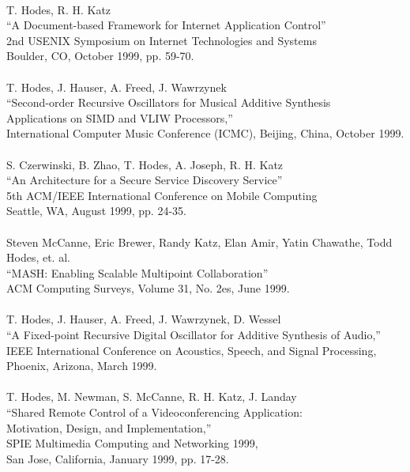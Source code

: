 \begin{tabbing}
\smallskip \\[-3pt]
\>    T. Hodes, R. H. Katz \\
\>\>      ``A Document-based Framework for Internet Application Control'' \\
\>\>       2nd USENIX Symposium on Internet Technologies and Systems \\
\>\>       Boulder, CO, October 1999, pp. 59-70. \\
\smallskip \\[-3pt]
\>    T. Hodes, J. Hauser, A. Freed, J. Wawrzynek\\
\>\>      ``Second-order Recursive Oscillators for Musical Additive Synthesis \\
\>\>\>        Applications on SIMD and VLIW Processors,'' \\
\>\>       International Computer Music Conference (ICMC), Beijing, China, October 1999. \\


\smallskip \\[-3pt]
\>    S. Czerwinski, B. Zhao, T. Hodes, A. Joseph, R. H. Katz \\
\>\>      ``An Architecture for a Secure Service Discovery Service'' \\
\>\>       5th ACM/IEEE International Conference on Mobile Computing \\
\>\>       Seattle, WA, August 1999, pp. 24-35. \\
\smallskip \\[-3pt]
\>    Steven McCanne, Eric Brewer, Randy Katz, Elan Amir, Yatin Chawathe,
    Todd Hodes, et. al. \\
\>\>      ``MASH: Enabling Scalable Multipoint Collaboration'' \\
\>\>       ACM Computing Surveys, Volume 31, No. 2es, June 1999. \\
\smallskip \\[-3pt]
\>    T. Hodes, J. Hauser, A. Freed, J. Wawrzynek, D. Wessel \\
\>\>      ``A Fixed-point Recursive Digital Oscillator for Additive Synthesis
        of Audio,'' \\
\>\>       IEEE International Conference on Acoustics, Speech, and Signal
            Processing,  \\
\>\>        Phoenix, Arizona, March 1999. \\
\smallskip \\[-3pt]
\>    T. Hodes, M. Newman, S. McCanne, R. H. Katz, J. Landay \\
\>\>      ``Shared Remote Control of a Videoconferencing Application: \\
\>\>\>            Motivation, Design, and Implementation,'' \\
\>\>       SPIE Multimedia Computing and Networking 1999,  \\
\>\>        San Jose, California, January 1999, pp. 17-28. \\
\smallskip \\[-3pt]

\end{tabbing}
